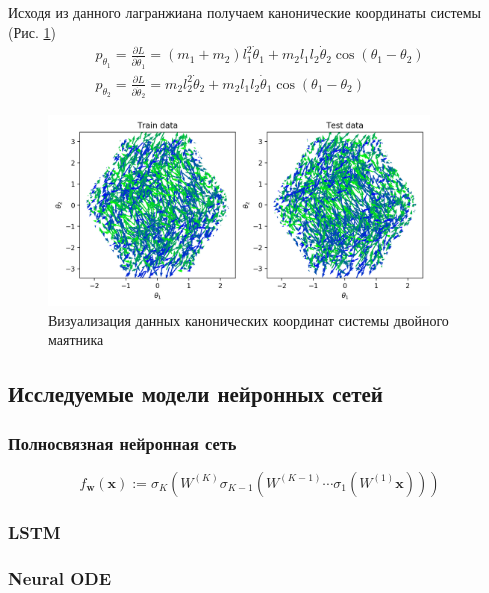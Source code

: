 \documentclass[12pt]{article}
\begin{document}
	Исходя из данного лагранжиана получаем канонические координаты системы (Рис. \ref{fig:canon})
	\begin{equation}
	\begin{array}{l}
	p_{\theta_{1}}=\frac{\partial L}{\partial \dot{\theta}_{1}}=\left(m_{1}+m_{2}\right) l_{1}^{2} \dot{\theta}_{1}+m_{2} l_{1} l_{2} \dot{\theta}_{2} \cos \left(\theta_{1}-\theta_{2}\right) \\
	p_{\theta_{2}}=\frac{\partial L}{\partial \dot{\theta}_{2}}=m_{2} l_{2}^{2} \dot{\theta}_{2}+m_{2} l_{1} l_{2} \dot{\theta}_{1} \cos \left(\theta_{1}-\theta_{2}\right)
	\end{array}
	\end{equation}


	\begin{figure}[H]
		\centering
		\includegraphics[width=0.9\textwidth]{train_test_data_vis.png}
		\caption{Визуализация данных канонических координат системы двойного маятника}
		\label{fig:canon}
	\end{figure}
	
	\subsection{Исследуемые модели нейронных сетей}
	\subsubsection{Полносвязная нейронная сеть}
	\begin{equation}
	f_{\boldsymbol{w}}(\boldsymbol{x}):=\sigma_{K}\left(W^{(K)} \sigma_{K-1}\left(W^{(K-1)} \cdots \sigma_{1}\left(W^{(1)} \boldsymbol{x}\right)\right)\right)
	\end{equation}
	
	\subsubsection{LSTM}
	\subsubsection{Neural ODE}
\end{document}
